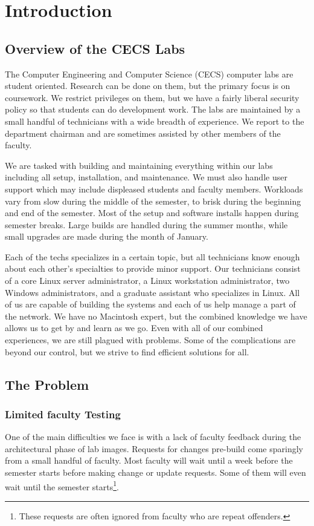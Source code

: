 \chapter{Introduction} \label{ch:introduction}
\section{Overview of the CECS Labs}

The Computer Engineering and Computer Science (CECS) computer labs are student oriented.  Research can be done on them, but the primary focus is on coursework.  We restrict privileges on them, but we have a fairly liberal security policy so that students can do development work.  The labs are maintained by a small handful of technicians with a wide breadth of experience.  We report to the department chairman and are sometimes assisted by other members of the faculty. 

We are tasked with building and maintaining everything within our labs including all setup, installation, and maintenance.  We must also handle user support which may include displeased students and faculty members.  Workloads vary from slow during the middle of the semester, to brisk during the beginning and end of the semester.  Most of the setup and software installs happen during semester breaks.  Large builds are handled during the summer months, while small upgrades are made during the month of January. 

Each of the techs specializes in a certain topic, but all technicians know enough about each other’s specialties to provide minor support.  Our technicians consist of a core Linux server administrator, a Linux workstation administrator, two Windows administrators, and a graduate assistant who specializes in Linux.  All of us are capable of building the systems and each of us help manage a part of the network.  We have no Macintosh expert, but the combined knowledge we have allows us to get by and learn as we go.  Even with all of our combined experiences, we are still plagued with problems.  Some of the complications are beyond our control, but we strive to find efficient solutions for all.

\section{The Problem} \label{sec:the_problem}
\subsection{Limited faculty Testing}
One of the main difficulties we face is with a lack of faculty feedback during the architectural phase of lab images.  Requests for changes pre-build come sparingly from a small handful of faculty.  Most faculty will wait until a week before the semester starts before making change or update requests.  Some of them will even wait until the semester starts\footnote{These requests are often ignored from faculty who are repeat offenders.}. 

